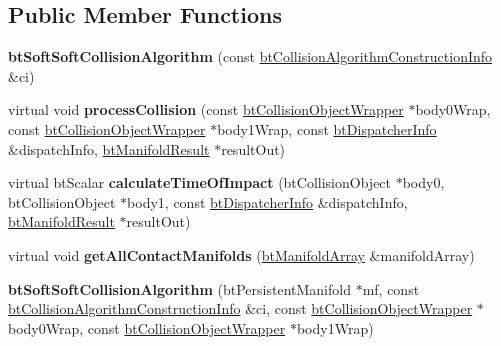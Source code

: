 \subsection*{Public Member Functions}
\begin{DoxyCompactItemize}
\item 
\hypertarget{classbt_soft_soft_collision_algorithm_a3156701ae0d941d149dd89c0afe12d40}{{\bfseries bt\+Soft\+Soft\+Collision\+Algorithm} (const \hyperlink{structbt_collision_algorithm_construction_info}{bt\+Collision\+Algorithm\+Construction\+Info} \&ci)}\label{classbt_soft_soft_collision_algorithm_a3156701ae0d941d149dd89c0afe12d40}

\item 
\hypertarget{classbt_soft_soft_collision_algorithm_a17b7d2ccdf40069b0f5236fd92a7bc49}{virtual void {\bfseries process\+Collision} (const \hyperlink{structbt_collision_object_wrapper}{bt\+Collision\+Object\+Wrapper} $\ast$body0\+Wrap, const \hyperlink{structbt_collision_object_wrapper}{bt\+Collision\+Object\+Wrapper} $\ast$body1\+Wrap, const \hyperlink{structbt_dispatcher_info}{bt\+Dispatcher\+Info} \&dispatch\+Info, \hyperlink{classbt_manifold_result}{bt\+Manifold\+Result} $\ast$result\+Out)}\label{classbt_soft_soft_collision_algorithm_a17b7d2ccdf40069b0f5236fd92a7bc49}

\item 
\hypertarget{classbt_soft_soft_collision_algorithm_a0ed8fb5e792c606652bab06790011346}{virtual bt\+Scalar {\bfseries calculate\+Time\+Of\+Impact} (bt\+Collision\+Object $\ast$body0, bt\+Collision\+Object $\ast$body1, const \hyperlink{structbt_dispatcher_info}{bt\+Dispatcher\+Info} \&dispatch\+Info, \hyperlink{classbt_manifold_result}{bt\+Manifold\+Result} $\ast$result\+Out)}\label{classbt_soft_soft_collision_algorithm_a0ed8fb5e792c606652bab06790011346}

\item 
\hypertarget{classbt_soft_soft_collision_algorithm_a8239cc2d97533ca18ea299a69cf7a16c}{virtual void {\bfseries get\+All\+Contact\+Manifolds} (\hyperlink{classbt_aligned_object_array}{bt\+Manifold\+Array} \&manifold\+Array)}\label{classbt_soft_soft_collision_algorithm_a8239cc2d97533ca18ea299a69cf7a16c}

\item 
\hypertarget{classbt_soft_soft_collision_algorithm_a30c98dafc3be8e645c48d5d378586a34}{{\bfseries bt\+Soft\+Soft\+Collision\+Algorithm} (bt\+Persistent\+Manifold $\ast$mf, const \hyperlink{structbt_collision_algorithm_construction_info}{bt\+Collision\+Algorithm\+Construction\+Info} \&ci, const \hyperlink{structbt_collision_object_wrapper}{bt\+Collision\+Object\+Wrapper} $\ast$body0\+Wrap, const \hyperlink{structbt_collision_object_wrapper}{bt\+Collision\+Object\+Wrapper} $\ast$body1\+Wrap)}\label{classbt_soft_soft_collision_algorithm_a30c98dafc3be8e645c48d5d378586a34}

\end{DoxyCompactItemize}
